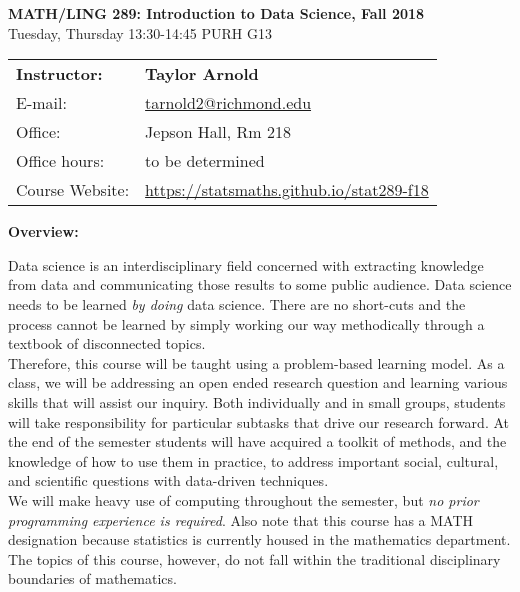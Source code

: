 \documentclass[12pt]{article}
\begin{document}
\begin{center}
{\bf MATH/LING 289: Introduction to Data Science, Fall 2018} \\
Tuesday, Thursday 13:30-14:45 \quad PURH G13\\
\end{center}

\bigskip

\noindent
\begin{tabular}{ l l }
{\bf Instructor:} &  {\bf Taylor Arnold} \\
E-mail: & \href{mailto:tarnold2@richmond.edu}{tarnold2@richmond.edu} \\
Office: & Jepson Hall, Rm 218 \\
Office hours: & to be determined \\
Course Website: & \url{https://statsmaths.github.io/stat289-f18}
\end{tabular}

\vspace{0.5cm}

\textbf{Overview:} \vspace{6pt}

Data science is an interdisciplinary field concerned with extracting knowledge
from data and communicating those results to some public audience. Data
science needs to be learned \textit{by doing} data science. There are
no short-cuts and the process cannot be learned by simply working our way
methodically through a textbook of disconnected topics.\\

Therefore, this course will be taught using a problem-based learning model. As
a class, we will be addressing an open ended research question and learning
various skills that will assist our inquiry. Both individually and in small
groups, students will take responsibility for particular subtasks that drive
our research forward. At the end of the semester students will have acquired
a toolkit of methods, and the knowledge of how to use them in practice, to
address important social, cultural, and scientific questions with data-driven
techniques.\\

We will make heavy use of computing throughout the semester, but \textit{no
prior programming experience is required}. Also note that this course has a
MATH designation because statistics is currently housed in the mathematics
department. The topics of this course, however, do not fall within the
traditional disciplinary boundaries of mathematics.\\
\end{document}
